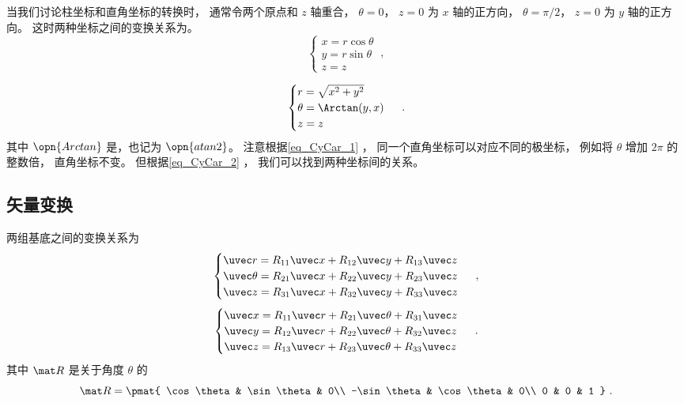 

当我们讨论柱坐标和直角坐标的转换时， 通常令两个原点和 $z$ 轴重合， $\theta = 0$， $z = 0$ 为 $x$ 轴的正方向， $\theta = \pi/2$， $z = 0$ 为 $y$ 轴的正方向。 这时两种坐标之间的变换关系为。
\begin{equation}\label{eq_CyCar_1}
\begin{cases}
x = r\cos \theta \\
y = r\sin \theta  \\
z = z 
\end{cases}~,
\end{equation}

\begin{equation}\label{eq_CyCar_2}
\begin{cases}
r = \sqrt{x^2+y^2} \\
\theta = \Arctan(y,x)  \\
z = z 
\end{cases}~.
\end{equation}
其中 $\opn{Arctan}$ 是，也记为 $\opn{atan2}$。 注意根据\autoref{eq_CyCar_1} ， 同一个直角坐标可以对应不同的极坐标， 例如将 $\theta$ 增加 $2\pi$ 的整数倍， 直角坐标不变。 但根据\autoref{eq_CyCar_2} ， 我们可以找到两种坐标间的关系。


\subsection{矢量变换}
两组基底之间的变换关系为
\begin{equation}\label{eq_CyCar_3}
\begin{cases}
\uvec r = R_{11}\uvec x + R_{12}\uvec y + R_{13}\uvec z\\
\uvec \theta = R_{21}\uvec x + R_{22}\uvec y + R_{23}\uvec z\\
\uvec z = R_{31}\uvec x + R_{32}\uvec y + R_{33}\uvec z
\end{cases}~,
\end{equation}
\begin{equation}\label{eq_CyCar_4}
\begin{cases}
\uvec x = R_{11} \uvec r + R_{21} \uvec \theta  + R_{31} \uvec z \\
\uvec y = R_{12} \uvec r + R_{22} \uvec \theta  + R_{32} \uvec z \\
\uvec z = R_{13} \uvec r + R_{23} \uvec \theta  + R_{33} \uvec z
\end{cases}~.
\end{equation}
其中 $\mat R$ 是关于角度 $\theta$ 的
\begin{equation}
\mat R = \pmat{
    \cos\theta & \sin\theta & 0\\
    -\sin\theta & \cos\theta & 0\\
    0 & 0 & 1
}~.
\end{equation}

